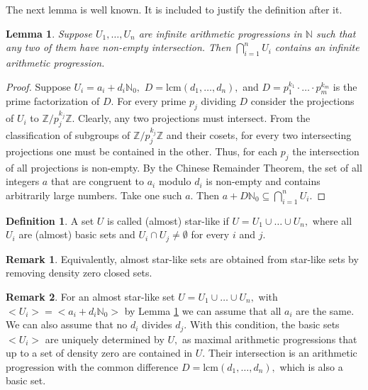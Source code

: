 \documentclass[10pt]{article}
\newtheorem{lemma}[theorem]{Lemma}
\theoremstyle{definition}
\newtheorem{definition}{Definition}
\newtheorem{remark}{Remark}
\begin{document}
The next lemma is well known. It is included to justify the definition after it.

\begin{lemma} \label{Lconsistency} Suppose $U_1, \dots, U_n$ are infinite arithmetic progressions in $\mathbb N$ such that any two of them have non-empty intersection. Then $\bigcap _{i=1}^{n} U_i $ contains an infinite arithmetic progression. 
\end{lemma}

\begin{proof} 
Suppose $U_i=a_i+d_i\mathbb N_0,$ $D=\textrm{lcm} (d_1,\dots ,d_n),$ and $D=p_1^{k_1}\cdot \dots \cdot p_m^{k_m}$ is the prime factorization of $D.$ For every prime $p_j$ dividing $D$ consider the projections of $U_i$ to $\mathbb Z/ p_j^{k_j}\mathbb Z.$  Clearly, any two projections must intersect. From the classification of subgroups of $\mathbb Z/ p_j^{k_j}\mathbb Z$ and their cosets, for every two intersecting projections one must be contained in the other. Thus, for each $p_j$ the intersection of all projections is non-empty. By the Chinese Remainder Theorem, the set of all integers $a$ that are congruent to $a_i$ modulo $d_i$ is non-empty and contains arbitrarily large numbers. Take one such $a$. Then $a+D\mathbb N_0\subseteq \bigcap _{i=1}^{n} U_i .$ 
\end{proof}


\begin{definition} \label{Dstar} A set $U$ is called (almost) star-like if $U=U_1\cup \ldots \cup U_n,$ where all $U_i$ are (almost) basic sets and  $U_i\cap U_j\neq \emptyset$ for every $i$ and $j.$
\end{definition}

\begin{remark} Equivalently, almost star-like sets are obtained from star-like sets by removing density zero closed sets.
\end{remark}

\begin{remark} For an almost star-like set $U=U_1\cup \ldots \cup U_n,$ with $<U_i>=<a_i+d_i\mathbb N_0>$ by Lemma \ref{Lconsistency} we can assume that all $a_i$ are the same. We can also assume that no $d_i$ divides $d_j$.  With this condition, the basic sets $<U_i>$ are uniquely determined  by $U,$ as maximal arithmetic progressions that up to a set of density zero are contained in $U.$ Their intersection is an arithmetic progression with the common difference $D=\textrm{lcm} (d_1,\dots ,d_n),$ which is also a basic set.
\end{remark}
\end{document}

